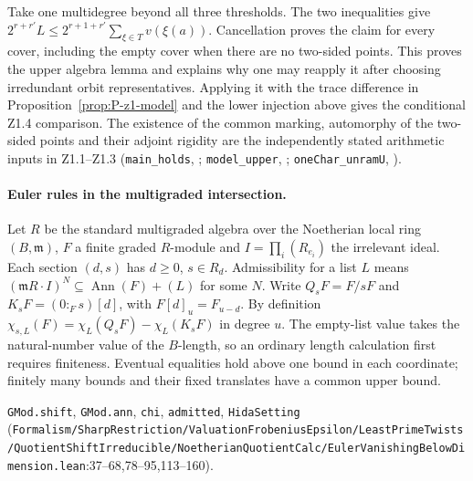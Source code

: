 Take one multidegree beyond all three thresholds. The two inequalities
give $2^{r+r'}L\le 2^{r+1+r'}\sum_{\xi\in T}v(\xi(a))$.
Cancellation proves the claim for every cover, including the empty
cover when there are no two-sided points. This proves the upper
algebra lemma and explains why one may reapply it after choosing
irredundant orbit representatives. Applying it with the trace
difference in Proposition~\ref{prop:P-z1-model} and the lower
injection above gives the conditional Z1.4 comparison. The
existence of the common marking, automorphy of the two-sided points
and their adjoint rigidity are the independently stated arithmetic
inputs in Z1.1--Z1.3 (\nolinkurl{main_holds},
; \nolinkurl{model_upper},
;
\nolinkurl{oneChar_unramU}, ).


\paragraph{Euler rules in the multigraded intersection.}
Let $R$ be the standard multigraded algebra over the Noetherian local ring $(B,\mathfrak m)$, $F$ a finite graded $R$-module and $I=\prod_i(R_{e_i})$ the irrelevant ideal. Each section $(d,s)$ has $d\ge0$, $s\in R_d$. Admissibility for a list $L$ means $(\mathfrak m R\cdot I)^N\subseteq\operatorname{Ann}(F)+(L)$ for some $N$. Write $Q_sF=F/sF$ and $K_sF=(0:_Fs)[d]$, with $F[d]_u=F_{u-d}$. By definition $\chi_{s,L}(F)=\chi_L(Q_sF)-\chi_L(K_sF)$ in degree $u$. The empty-list value takes the natural-number value of the $B$-length, so an ordinary length calculation first requires finiteness. Eventual equalities hold above one bound in each coordinate; finitely many bounds and their fixed translates have a common upper bound.

{\footnotesize \nolinkurl{GMod.shift}, \nolinkurl{GMod.ann}, \nolinkurl{chi}, \nolinkurl{admitted}, \nolinkurl{HidaSetting} (\nolinkurl{Formalism/SharpRestriction/ValuationFrobeniusEpsilon/LeastPrimeTwists/QuotientShiftIrreducible/NoetherianQuotientCalc/EulerVanishingBelowDimension.lean}\allowbreak:37--68,78--95,113--160).}


